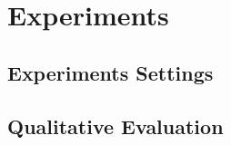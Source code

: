 \section{Experiments}
\label{experiments}
\subsection{Experiments Settings}
\subsection{Qualitative Evaluation}
